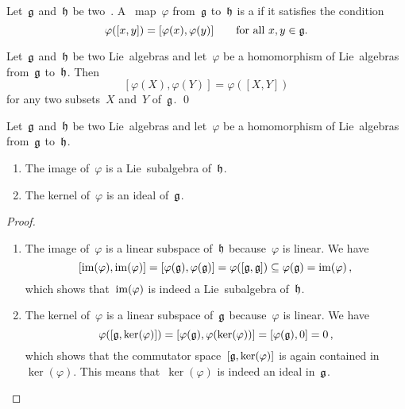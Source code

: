 \begin{definition}
	Let~$\mathfrak{g}$ and~$\mathfrak{h}$ be two~\liealgebras{$\kf$}.
	A~\linear{$\kf$} map~$\varphi$ from~$\mathfrak{g}$ to~$\mathfrak{h}$ is a  if it satisfies the condition
 \[
	 \varphi([x,y])
	 =
	 [\varphi(x), \varphi(y)]
	 \qquad
	 \text{for all~$x, y \in \mathfrak{g}$.}
 \]
\end{definition}


\begin{proposition}
	Let~$\mathfrak{g}$ and~$\mathfrak{h}$ be two Lie~algebras and let~$\varphi$ be a homomorphism of Lie~algebras from~$\mathfrak{g}$ to~$\mathfrak{h}$.
	Then
	\[
		[ \varphi(X), \varphi(Y) ]
		=
		\varphi( [X, Y] )
	\]
	for any two subsets~$X$ and~$Y$ of~$\mathfrak{g}$.
	\qed
\end{proposition}


\begin{proposition}
	Let~$\mathfrak{g}$ and~$\mathfrak{h}$ be two Lie~algebras and let~$\varphi$ be a homomorphism of Lie~algebras from~$\mathfrak{g}$ to~$\mathfrak{h}$.
	\begin{enumerate}
		\item
			The image of~$\varphi$ is a Lie~subalgebra of~$\mathfrak{h}$.
		\item
			The kernel of~$\varphi$ is an ideal of~$\mathfrak{g}$.
	\end{enumerate}
\end{proposition}


\begin{proof}
	\leavevmode
	\begin{enumerate}
		\item
			The image of~$\varphi$ is a linear subspace of~$\mathfrak{h}$ because~$\varphi$ is linear.
			We have
			\[
				[ \operatorname{im}(\varphi), \operatorname{im}(\varphi) ]
				=
				[ \varphi(\mathfrak{g}), \varphi(\mathfrak{g}) ]
				=
				\varphi( [\mathfrak{g}, \mathfrak{g}] )
				\subseteq
				\varphi(\mathfrak{g})
				=
				\operatorname{im}(\varphi) \,,
			\]
			which shows that~$\operatorname{im}(\varphi)$ is indeed a Lie~subalgebra of~$\mathfrak{h}$.
		\item
			The kernel of~$\varphi$ is a linear subspace of~$\mathfrak{g}$ because~$\varphi$ is linear.
			We have
			\[
				\varphi( [\mathfrak{g}, \ker(\varphi)] )
				=
				[ \varphi(\mathfrak{g}), \varphi(\ker(\varphi)) ]
				=
				[ \varphi(\mathfrak{g}), 0 ]
				=
				0 \,,
			\]
			which shows that the commutator space~$[\mathfrak{g}, \ker(\varphi)]$ is again contained in~$\ker(\varphi)$.
			This means that~$\ker(\varphi)$ is indeed an ideal in~$\mathfrak{g}$.
		\qedhere
	\end{enumerate}
\end{proof}


